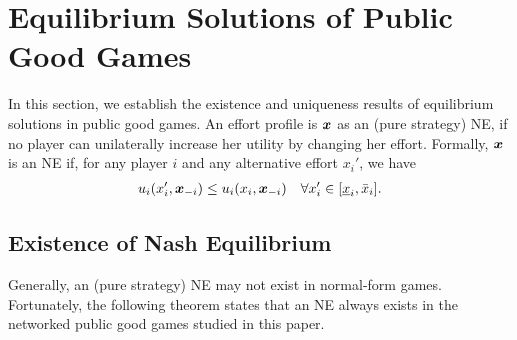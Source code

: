 \section{Equilibrium Solutions of Public Good Games}
\label{sec:equilibrium}

In this section, we establish the existence and uniqueness results of equilibrium solutions in public good games. An effort profile is ${\bm{x}}$ as an (pure strategy) NE, if no player can unilaterally increase her utility by changing her effort. Formally, ${\bm{x}}$ is an NE if, for any player $i$ and any alternative effort $x_i'$, we have
\begin{align}
\label{eq:static:NE}
    u_i(x_i', {\bm{x}}_{-i}) \le u_i(x_i, {\bm{x}}_{-i}) \quad \forall x'_i \in [\underline{x}_i, \bar{x}_i].
\end{align}



\subsection{Existence of Nash Equilibrium}

Generally, an (pure strategy) NE may not exist in normal-form games. Fortunately, the following theorem states that an NE always exists in the networked public good games studied in this paper. 

